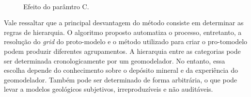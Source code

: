 \begin{figure}[H]
    \caption{Efeito do parâmtro C.} \label{fig:sensitivity_c}
     \centering
     \hspace{1em}
      \\
\end{figure}

Vale ressaltar que a principal desvantagem do método consiste em determinar as regras de hierarquia. O algoritmo proposto automatiza o processo, entretanto, a resolução do \textit{grid} do proto-modelo e o método utilizado para criar o pro-tomodelo podem produzir diferentes agrupamentos. A hierarquia entre as categorias pode ser determinada cronologicamente por um geomodelador. No entanto, essa escolha depende do conhecimento sobre o depósito mineral e da experiência do geomodelador. Também pode ser determinado de forma arbitrária, o que pode levar a modelos geológicos subjetivos, irreproduzíveis e não auditáveis.

